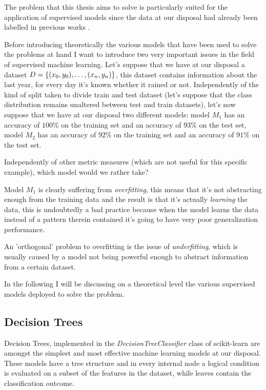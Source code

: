 The problem that this thesis aims to solve is particularly suited for the application of supervised
models since the data at our disposal had already been labelled in previous works
\cite{mariotto2022-generic} \cite{mariotto2022}.

Before introducing theoretically the various models that have been used to solve the problems at
hand I want to introduce two very important issues in the field of supervised machine learning.
Let's suppose that we have at our disposal a dataset $D = \{(x_0, y_0), \ldots, (x_n, y_n)\}$, this dataset contains information
about the last year, for every day it's known whether it rained or not. Independently of the kind of
split taken to divide train and test dataset (let's suppose that the class distribution remains
unaltered between test and train datasets), let's now suppose that we have at our disposal two
different models: model $M_1$ has an accuracy of $100\%$ on the training set and an accuracy of
$93\%$ on the test set, model $M_2$ has an accuracy of $92\%$ on the training set and an accuracy of
$91\%$ on the test set.

Independently of other metric measures (which are not useful for this specific example), which model
would we rather take?

Model $M_1$ is clearly suffering from \emph{overfitting}, this means that it's not abstracting
enough from the training data and the result is that it's actually \emph{learning} the data, this is
undoubtedly a bad practice because when the model learns the data instead of a pattern therein
contained it's going to have very poor generalization performance.

An 'orthogonal' problem to overfitting is the issue of \emph{underfitting}, which is usually caused
by a model not being powerful enough to abstract information from a certain dataset.

In the following I will be discussing on a theoretical level the various supervised models deployed
to solve the problem.
\subsection{Decision Trees}
Decision Trees, implemented in the \emph{DecisionTreeClassifier} class of scikit-learn are amongst the
simplest and most effective machine learning models at our disposal. These models have a tree
structure and in every internal node a logical condition is evaluated on a subset of the features
in the dataset, while leaves contain the classification outcome.

